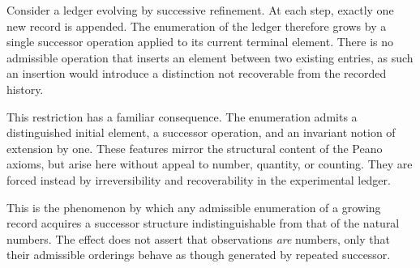 Consider a ledger evolving by successive refinement.  At each step, exactly one
new record is appended.  The enumeration of the ledger therefore grows by a
single successor operation applied to its current terminal element.  There is
no admissible operation that inserts an element between two existing entries,
as such an insertion would introduce a distinction not recoverable from the
recorded history.

This restriction has a familiar consequence.  The enumeration admits a
distinguished initial element, a successor operation, and an invariant notion
of extension by one.  These features mirror the structural content of the Peano
axioms, but arise here without appeal to number, quantity, or counting.  They
are forced instead by irreversibility and recoverability in the experimental
ledger.

This is the phenomenon by which any admissible enumeration of a growing record acquires a successor
structure indistinguishable from that of the natural numbers.  The effect does
not assert that observations \emph{are} numbers, only that their admissible
orderings behave as though generated by repeated successor.



